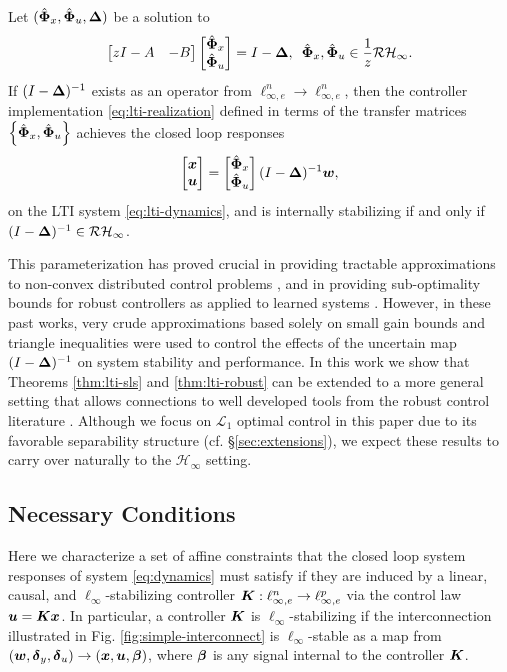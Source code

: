 \begin{theorem}\label{thm:lti-robust}
Let $(\hat{\boldsymbol{\Phi}}_x,\hat{\boldsymbol{\Phi}}_u,{\boldsymbol{\Delta}})$ be a solution to
\begin{equation}
\begin{bmatrix} zI - A & - B \end{bmatrix} \begin{bmatrix} \hat{\boldsymbol{\Phi}}_x \\ \hat{\boldsymbol{\Phi}}_u \end{bmatrix} = I - {\boldsymbol{\Delta}}, \, \ \hat{\boldsymbol{\Phi}}_x, \hat{\boldsymbol{\Phi}}_u \in \frac{1}{z}\mathcal{RH}_\infty.
\label{eq:lti-robust}
\end{equation}
If $(I-{\boldsymbol{\Delta}})^{-1}$ exists as an operator from $\ell^n_{\infty,e} \to \ell^n_{\infty,e}$, then the controller implementation \eqref{eq:lti-realization} defined in terms of the transfer matrices $\left\{\hat{\boldsymbol{\Phi}}_x,\hat{\boldsymbol{\Phi}}_u\right\}$ achieves the closed loop responses
\begin{equation}
\begin{bmatrix}\boldsymbol{x} \\ \boldsymbol{u} \end{bmatrix} = \begin{bmatrix} \hat{\boldsymbol{\Phi}}_x \\ \hat{\boldsymbol{\Phi}}_u \end{bmatrix}(I-{\boldsymbol{\Delta}})^{-1}\boldsymbol{w},
\end{equation}
on the LTI system \eqref{eq:lti-dynamics}, and is internally stabilizing if and only if $(I-{\boldsymbol{\Delta}})^{-1} \in \mathcal{RH}_\infty$.
\end{theorem}
This parameterization has proved crucial in providing tractable approximations to non-convex distributed control problems \cite{matni2017scalable}, and in providing sub-optimality bounds for robust controllers as applied to learned systems \cite{dean2017sample,dean2019safely}.  However, in these past works, very crude approximations based solely on small gain bounds and triangle inequalities were used to control the effects of the uncertain map $(I-{\boldsymbol{\Delta}})^{-1}$ on system stability and performance.  In this work we show that Theorems \ref{thm:lti-sls} and \ref{thm:lti-robust} can be extended to a more general setting that allows connections to well developed tools from the robust control literature \cite{khammash1990stability,dahleh1994control}.  Although we focus on $\mathcal{L}_1$ optimal control in this paper due to its favorable separability structure (cf. \S \ref{sec:extensions}), we expect these results to carry over naturally to the $\mathcal{H}_\infty$ setting.

\subsection{Necessary Conditions}
Here we characterize a set of affine constraints that the closed loop system responses of system \eqref{eq:dynamics} must satisfy if they are induced by a linear, causal, and $\ell_\infty$-stabilizing controller $\boldsymbol{K} : \ell^n_{\infty,e} \to \ell^p_{\infty,e}$ via the control law $\boldsymbol{u} = \boldsymbol{K} \boldsymbol{x}$.  In particular, a controller $\boldsymbol{K}$ is $\ell_\infty$-stabilizing if the interconnection illustrated in Fig. \ref{fig:simple-interconnect} is $\ell_\infty$-stable as a map from $(\boldsymbol{w}, \boldsymbol{\delta}_y, \boldsymbol{\delta}_u)\to (\boldsymbol{x},\boldsymbol{u},\boldsymbol{\beta})$, where $\boldsymbol{\beta}$ is any signal internal to the controller $\boldsymbol{K}$.

